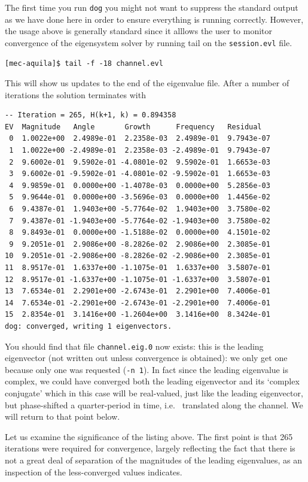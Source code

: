 \documentclass[11pt,a4paper]{report}
\newcommand{\ie}{i.e.\ }
\begin{document}
The first time you run \verb+dog+ you might not want to suppress the
standard output as we have done here in order to ensure everything is
running correctly. However, the usage above is generally standard
since it alllows the user to monitor convergence of the eigensystem
solver by running tail on the \verb+session.evl+ file.  {\small
\begin{verbatim}
[mec-aquila]$ tail -f -18 channel.evl
\end{verbatim}
} This will show us updates to the end of the eigenvalue file.  After
a number of iterations the solution terminates with {\small
\begin{verbatim}
-- Iteration = 265, H(k+1, k) = 0.894358
EV  Magnitude   Angle       Growth      Frequency   Residual
 0  1.0022e+00  2.4989e-01  2.2358e-03  2.4989e-01  9.7943e-07
 1  1.0022e+00 -2.4989e-01  2.2358e-03 -2.4989e-01  9.7943e-07
 2  9.6002e-01  9.5902e-01 -4.0801e-02  9.5902e-01  1.6653e-03
 3  9.6002e-01 -9.5902e-01 -4.0801e-02 -9.5902e-01  1.6653e-03
 4  9.9859e-01  0.0000e+00 -1.4078e-03  0.0000e+00  5.2856e-03
 5  9.9644e-01  0.0000e+00 -3.5696e-03  0.0000e+00  1.4456e-02
 6  9.4387e-01  1.9403e+00 -5.7764e-02  1.9403e+00  3.7580e-02
 7  9.4387e-01 -1.9403e+00 -5.7764e-02 -1.9403e+00  3.7580e-02
 8  9.8493e-01  0.0000e+00 -1.5188e-02  0.0000e+00  4.1501e-02
 9  9.2051e-01  2.9086e+00 -8.2826e-02  2.9086e+00  2.3085e-01
10  9.2051e-01 -2.9086e+00 -8.2826e-02 -2.9086e+00  2.3085e-01
11  8.9517e-01  1.6337e+00 -1.1075e-01  1.6337e+00  3.5807e-01
12  8.9517e-01 -1.6337e+00 -1.1075e-01 -1.6337e+00  3.5807e-01
13  7.6534e-01  2.2901e+00 -2.6743e-01  2.2901e+00  7.4006e-01
14  7.6534e-01 -2.2901e+00 -2.6743e-01 -2.2901e+00  7.4006e-01
15  2.8354e-01  3.1416e+00 -1.2604e+00  3.1416e+00  8.3424e-01
dog: converged, writing 1 eigenvectors.
\end{verbatim}
} You should find that file \verb+channel.eig.0+ now exists: this is
the leading eigenvector (not written out unless convergence is
obtained): we only get one because only one was requested
(\verb+-n 1+).  In fact since the leading eigenvalue is complex, we
could have converged both the leading eigenvector and its `complex
conjugate' which in this case will be real-valued, just like the
 leading eigenvector, but phase-shifted a quarter-period in time, \ie
 translated along the channel. We will return to that point below.

Let us examine the significance of the listing above.  The first point
is that 265 iterations were required for convergence, largely
reflecting the fact that there is not a great deal of separation of
the magnitudes of the leading eigenvalues, as an inspection of the
less-converged values indicates.
\end{document}
